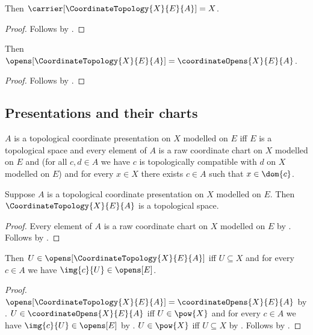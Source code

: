 \begin{proposition}\label{coordinate_topology_carrier}
    Then $\carrier[\CoordinateTopology{X}{E}{A}]=X$.
\end{proposition}
\begin{proof}
    Follows by .
\end{proof}

\begin{proposition}\label{coordinate_topology_opens}
    Then $\opens[\CoordinateTopology{X}{E}{A}]=\coordinateOpens{X}{E}{A}$.
\end{proposition}
\begin{proof}
    Follows by .
\end{proof}

\subsection{Presentations and their charts}

\begin{definition}\label{topological_coordinate_presentation}
    $A$ is a topological coordinate presentation on $X$ modelled on $E$ iff
        $E$ is a topological space and
        every element of $A$ is a raw coordinate chart on $X$ modelled on $E$ and
        (for all $c,d\in A$ we have
            $c$ is topologically compatible with $d$ on $X$ modelled on $E$) and
        for every $x\in X$ there exists $c\in A$ such that $x\in\dom{c}$.
\end{definition}

\begin{classification}\label{coordinate_presentation_topology}
    Suppose $A$ is a topological coordinate presentation on $X$ modelled on $E$.
    Then $\CoordinateTopology{X}{E}{A}$ is a topological space.
\end{classification}
\begin{proof}
    Every element of $A$ is a raw coordinate chart on $X$ modelled on $E$ by
        .
    Follows by .
\end{proof}

\begin{theorem}\label{coordinate_topology_open_iff}
    Then $U\in\opens[\CoordinateTopology{X}{E}{A}]$ iff
        $U\subseteq X$ and
        for every $c\in A$ we have $\img{c}{U}\in\opens[E]$.
\end{theorem}
\begin{proof}
    $\opens[\CoordinateTopology{X}{E}{A}]=\coordinateOpens{X}{E}{A}$ by
        .
    $U\in\coordinateOpens{X}{E}{A}$ iff $U\in\pow{X}$ and
        for every $c\in A$ we have $\img{c}{U}\in\opens[E]$
        by .
    $U\in\pow{X}$ iff $U\subseteq X$ by .
    Follows by \auto.
\end{proof}

